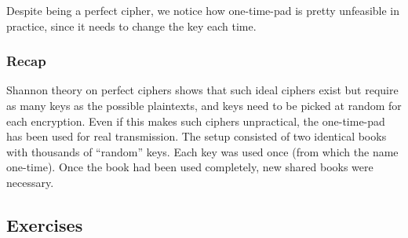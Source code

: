 Despite being a perfect cipher, we notice how one-time-pad is pretty unfeasible in practice, since it needs to change the key each time.

\subsubsection{Recap}
Shannon theory on perfect ciphers shows that such ideal ciphers exist but require as many keys as the possible plaintexts, and keys need to be picked at random for each encryption. Even if this makes such ciphers unpractical, the one-time-pad has been used for real transmission. The setup consisted of two identical books with thousands of  “random” keys. Each key was used once (from which the name one-time). Once the book had been used completely, new shared books were necessary.

\newpage
\subsection{Exercises}

